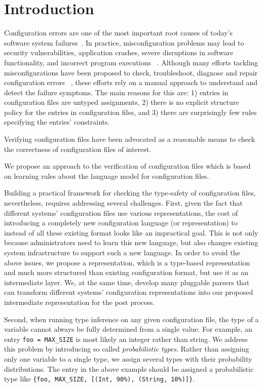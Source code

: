 \section{Introduction}
\label{sec-intro}

Configuration errors are one of the most important root causes of
today's software system failures~\cite{xu15systems, yin11anempirical}.
In practice, misconfiguration problems may lead to security
vulnerabilities, application crashes, severe disruptions in software
functionality, and incorrect program executions%
~\cite{zhang14encore, yuan11context, xu13do, xu15hey}.  
Although many efforts tackling misconfigurations have been proposed 
to check, troubleshoot, diagnose and repair configuration errors%
~\cite{wang04automatic, attariyan10automating,
su07autobash, whitaker04configuration}, these efforts rely on a manual 
approach to understand and detect the failure symptoms. 
The main reasons for this are:
1) entries in configuration files are untyped assignments, 2) there
is no explicit structure policy for the entries in configuration
files, and 3) there are surprisingly few rules specifying the
entries' constraints.

Verifying configuration files have been advocated as a reasonable means
to check the correctness of configuration files of interest.

We propose an approach to the verification of  
configuration files which is based on learning rules about the language 
model for configuration files. 

Building a practical framework for checking the type-safety of
configuration files, nevertheless, requires addressing several
challenges. First, given the fact that 
different systems' configuration files use various representations, 
the cost of introducing a completely new configuration
language (or representation) to instead of all these existing format looks 
like an impractical goal. This is not only because administrators need 
to learn this new language, but also changes existing system
infrastructure to support such a new language. 
In order to avoid the above issues, we propose a representation,
which is a type-based representation and 
much more structured than existing configuration format, 
but use it as an intermediate layer. We, at the same time,
develop many pluggable parsers
that can transform different systems' configuration representations
into our proposed intermediate representation for the post process.

Second, when running type inference on any given configuration file, 
the type of a variable cannot always be fully determined from a single 
value. For example, an entry {\tt foo = MAX\_SIZE} is most likely
an integer rather than string. We address this problem by introducing 
so called {\emph{probabilistic types}}.
Rather than assigning only one variable to a single type, 
we assign several types with their probability distributions. 
The entry in the above example should be assigned 
a probabilistic type like 
{\tt \{foo, MAX\_SIZE, [(Int, 90\%), (String, 10\%)]\}}.

